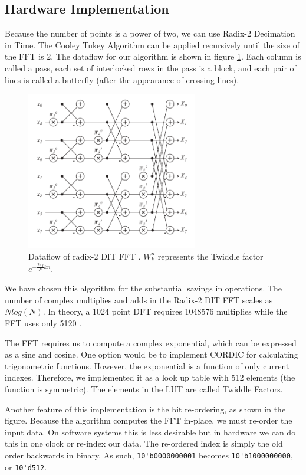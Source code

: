 \documentclass[twoside]{article}
\begin{document}
  \subsection{Hardware Implementation}
  Because the number of points is a power of two, we can use Radix-2 Decimation in Time.
  The Cooley Tukey Algorithm can be applied recursively until the size of the FFT is 2.  
  The dataflow for our algorithm is shown in figure \ref{fig:butterfly}.  Each column
  is called a pass, each set of interlocked rows in the pass is a block, and each pair of lines is called a 
  butterfly (after the appearance of crossing lines).
  \begin{figure}[h]
  \includegraphics[width=75mm]{images/butterfly.pdf}
  \caption{Dataflow of radix-2 DIT FFT \cite{bib:butterfly}. $W_k^n$ represents the Twiddle factor $e^{-\frac{2\pi j}{N}kn}$.}  
  \label{fig:butterfly}
  \end{figure}
  
  We have chosen this algorithm for the substantial savings in operations. The number of complex multiplies and adds in
  the Radix-2 DIT FFT scales as $Nlog(N)$. In theory, a 1024 point DFT requires 1048576 multiplies while the FFT uses 
  only 5120 \cite{bib:fftdit}.
  
  The FFT requires us to compute a complex exponential, which can be expressed as a sine and cosine.  One option would be to 
  implement CORDIC for calculating trigonometric functions.  However, the exponential is a function of only current indexes.  
  Therefore, we implemented it as a look up table with 512 elements (the function is symmetric).  The elements in the LUT
  are called Twiddle Factors. 
  
  Another feature of this implementation is the bit re-ordering, as shown in the figure. Because the algorithm computes the
  FFT in-place, we must re-order the input data.  On software systems this is less desirable but in hardware we can do this
  in one clock or re-index our data.  The re-ordered index is simply the old order backwards in binary.  As such, 
  \lstinline!10'b0000000001! becomes \lstinline!10'b1000000000!, or \lstinline!10'd512!.
  
\end{document}
